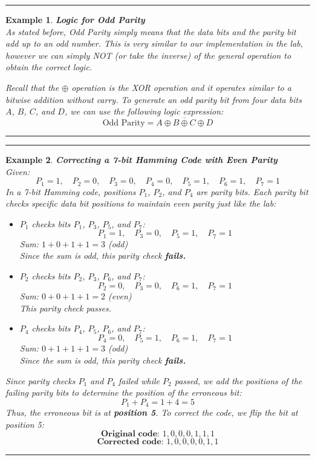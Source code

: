 \documentclass[12pt]{article}
\newtheorem{example}{Example}
\newenvironment{examp}
{\vspace{0.5cm}
 \hrule
\vspace{0.5cm}
\begin{example}}
{\hrule
\vspace{0.5cm}
\end{example}}
\begin{document}
\begin{examp} \textbf{Logic for Odd Parity}\\ As stated before, Odd Parity
	simply means that the data bits and the parity bit add up to an odd
	number. This is very similar to our implementation in the lab, however
	we can simply NOT (or take the inverse) of the general operation to
	obtain the correct logic.

	Recall that the \(\oplus\) operation is the XOR operation and it
	operates similar to a bitwise addition without carry. To generate an odd
	parity bit from four data bits \( A \), \( B \), \( C \), and \( D \),
	we can use the following logic expression: \[			\text{Odd Parity} =
		\overline{A \oplus B \oplus C \oplus D}\]

\end{examp} \begin{examp} \textbf{Correcting a 7-bit Hamming Code with
		Even Parity}\\ Given: \[ P_1 = 1, \quad P_2 = 0, \quad P_3 = 0, \quad
		P_4 = 0, \quad P_5 = 1, \quad P_6 = 1, \quad P_7 = 1 \] In a 7-bit
	Hamming code, positions \( P_1 \), \( P_2 \), and \( P_4 \) are parity
	bits. Each parity bit checks specific data bit positions to maintain
	even parity just like the lab: \begin{itemize} \item \textbf{\( P_1 \)}
		      checks bits \( P_1 \), \( P_3 \), \( P_5 \), and \( P_7 \): \[ P_1 =
			      1, \quad P_3 = 0, \quad P_5 = 1, \quad P_7 = 1 \] Sum: \( 1 + 0 + 1 +
		      1 = 3 \) (odd) \\ Since the sum is odd, this parity check
		      \textbf{fails.}

		\item \textbf{\( P_2 \)} checks bits \( P_2 \), \( P_3 \), \( P_6 \),
		      and \( P_7 \): \[ P_2 = 0, \quad P_3 = 0, \quad P_6 = 1, \quad P_7 =
			      1 \] Sum: \( 0 + 0 + 1 + 1 = 2 \) (even) \\ This parity check
		      passes.

		\item \textbf{\( P_4 \)} checks bits \( P_4 \), \( P_5 \), \( P_6 \),
		      and \( P_7 \): \[ P_4 = 0, \quad P_5 = 1, \quad P_6 = 1, \quad P_7 = 1
		      \] Sum: \( 0 + 1 + 1 + 1 = 3 \) (odd) \\ Since the sum is odd, this
		      parity check \textbf{fails.} \end{itemize} Since parity checks \( P_1 \) and
	\( P_4 \) failed while \( P_2 \) passed, we add the positions of the failing
	parity bits to determine the position of the erroneous bit: \[ P_1 + P_4 = 1
		+ 4 = 5 \] Thus, the erroneous bit is at \textbf{position 5}. To correct the
	code, we flip the bit at position 5: \[ \textbf{Original code: } 1, 0, 0, 0,
		1, 1, 1 \] \[ \textbf{Corrected code: } 1, 0, 0, 0, 0, 1, 1 \] \end{examp}
\end{document}
